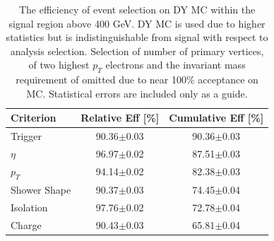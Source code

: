    \begin {table}[h]
      \begin{center}
      \begin{tabular}{|l|c|c|}
         \hline
         \hline
         Criterion & Relative Eff [\%] & Cumulative Eff [\%] \\
         \hline
         Trigger & 90.36$\pm$0.03 & 90.36$\pm$0.03 \\
         $\eta$ & 96.97$\pm$0.02 & 87.51$\pm$0.03 \\
         $p_{T}$ & 94.14$\pm$0.02 & 82.38$\pm$0.03 \\
         Shower Shape & 90.37$\pm$0.03 & 74.45$\pm$0.04 \\
         Isolation & 97.76$\pm$0.02 & 72.78$\pm$0.04 \\
         Charge & 90.43$\pm$0.03 & 65.81$\pm$0.04 \\
         \hline
         \hline
      \end{tabular}
      \caption{The efficiency of event selection on DY MC within the signal region above 400 GeV. DY MC is used due to higher statistics but is indistinguishable from signal with respect to analysis selection. Selection of number of primary vertices, of two highest $p_{T}$ electrons and the invariant mass requirement of omitted due to near 100\% acceptance on MC. Statistical errors are included only as a guide.}
      \label{tab:eventEff}
      \end{center}
   \end {table}




